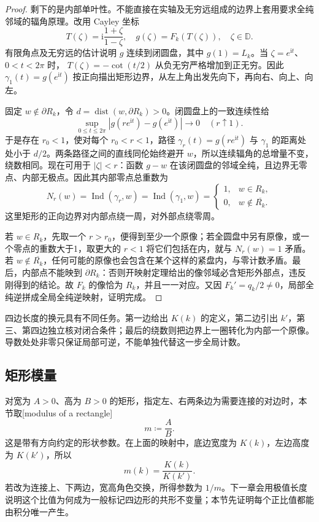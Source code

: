 \begin{proof}
剩下的是内部单叶性。不能直接在实轴及无穷远组成的边界上套用要求全纯邻域的辐角原理。改用 Cayley 坐标
\[
 T(\zeta)=\mathrm{i}\frac{1+\zeta}{1-\zeta},\quad
 g(\zeta)=F_k(T(\zeta)),\quad \zeta\in\mathbb D.
\]
有限角点及无穷远的估计说明 \(g\) 连续到闭圆盘，其中 \(g(1)=L_k\)。当 \(\zeta=e^{\mathrm{i}t}\)、\(0<t<2\pi\) 时，
\(T(\zeta)=-\cot(t/2)\) 从负无穷严格增加到正无穷。因此
\(\gamma_1(t)=g(e^{\mathrm{i}t})\)
按正向描出矩形边界，从左上角出发先向下，再向右、向上、向左。

固定 \(w\notin\partial R_k\)，令 \(d=\operatorname{dist}(w,\partial R_k)>0\)。闭圆盘上的一致连续性给
\[
 \sup_{0\le t\le2\pi}
 |g(re^{\mathrm{i}t})-g(e^{\mathrm{i}t})|\longrightarrow0
 \quad(r\uparrow1).
\]
于是存在 \(r_0<1\)，使对每个 \(r_0<r<1\)，路径
\(\gamma_r(t)=g(re^{\mathrm{i}t})\)
与 \(\gamma_1\) 的距离处处小于 \(d/2\)。两条路径之间的直线同伦始终避开 \(w\)，所以连续辐角的总增量不变，绕数相同。现在可用于 \(|\zeta|<r\)：函数 \(g-w\) 在该闭圆盘的邻域全纯，且边界无零点、内部无极点。因此其内部零点总重数为
\[
 N_r(w)=\operatorname{Ind}(\gamma_r,w)
 =\operatorname{Ind}(\gamma_1,w)
 =\begin{cases}
 1,&w\in R_k,\\
 0,&w\notin\overline{R_k}.
 \end{cases}
\]
这里矩形的正向边界对内部点绕一周，对外部点绕零周。

若 \(w\in R_k\)，先取一个 \(r>r_0\)，便得到至少一个原像；若全圆盘中另有原像，或一个零点的重数大于1，取更大的 \(r<1\) 将它们包括在内，就与 \(N_r(w)=1\) 矛盾。若 \(w\notin\overline{R_k}\)，任何可能的原像也会包含在某个这样的紧盘内，与零计数矛盾。最后，内部点不能映到 \(\partial R_k\)：否则开映射定理给出的像邻域必含矩形外部点，违反刚得到的结论。故 \(F_k\) 的像恰为 \(R_k\)，并且一一对应。又因 \(F_k'=q_k/2\ne0\)，局部全纯逆拼成全局全纯逆映射，证明完成。
\end{proof}

四边长度的换元具有不同任务。第一边给出 \(K(k)\) 的定义，第二边引出 \(k'\)，第三、第四边独立核对闭合条件；最后的绕数则把边界上一圈转化为内部一个原像。导数处处非零只保证局部可逆，不能单独代替这一步全局计数。

\subsection{矩形模量}
\label{b3:subsec:070403}

对宽为 \(A>0\)、高为 \(B>0\) 的矩形，指定左、右两条边为需要连接的对边时，本节取[modulus of a rectangle]
\[
 m\coloneqq\frac AB.
\]
这是带有方向约定的形状参数。在上面的映射中，底边宽度为 \(K(k)\)，左边高度为 \(K(k')\)，所以
\[
 m(k)=\frac{K(k)}{K(k')}.
\]
若改为连接上、下两边，宽高角色交换，所得参数为 \(1/m\)。下一章会用极值长度说明这个比值为何成为一般标记四边形的共形不变量；本节先证明每个正比值都能由积分唯一产生。

